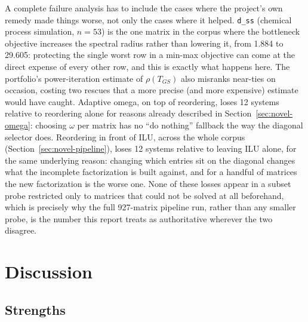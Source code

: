 \documentclass[11pt,a4paper]{article}
\newcommand{\code}[1]{\texttt{\footnotesize #1}}
\begin{document}
A complete failure analysis has to include the cases where the project's own remedy made
things worse, not only the cases where it helped. \code{d\_ss} (chemical process
simulation, $n=53$) is the one matrix in the corpus where the bottleneck objective
increases the spectral radius rather than lowering it, from 1.884 to 29.605: protecting the
single worst row in a min-max objective can come at the direct expense of every other row,
and this is exactly what happens here. The portfolio's power-iteration estimate of
$\rho(T_{GS})$ also misranks near-ties on occasion, costing two rescues that a more
precise (and more expensive) estimate would have caught. Adaptive omega, on top of
reordering, loses 12 systems relative to reordering alone for reasons already described in
Section~\ref{sec:novel-omega}: choosing $\omega$ per matrix has no ``do nothing''
fallback the way the diagonal selector does. Reordering in front of ILU, across the whole
corpus (Section~\ref{sec:novel-pipeline}), loses 12 systems relative to leaving ILU alone,
for the same underlying reason: changing which entries sit on the diagonal changes what
the incomplete factorization is built against, and for a handful of matrices the new
factorization is the worse one. None of these losses appear in a subset probe restricted
only to matrices that could not be solved at all beforehand, which is precisely why the
full 927-matrix pipeline run, rather than any smaller probe, is the number this report
treats as authoritative wherever the two disagree.

\clearpage
\section{Discussion}
\label{sec:discussion}

\subsection{Strengths}
\label{sec:discussion-strengths}
\end{document}
